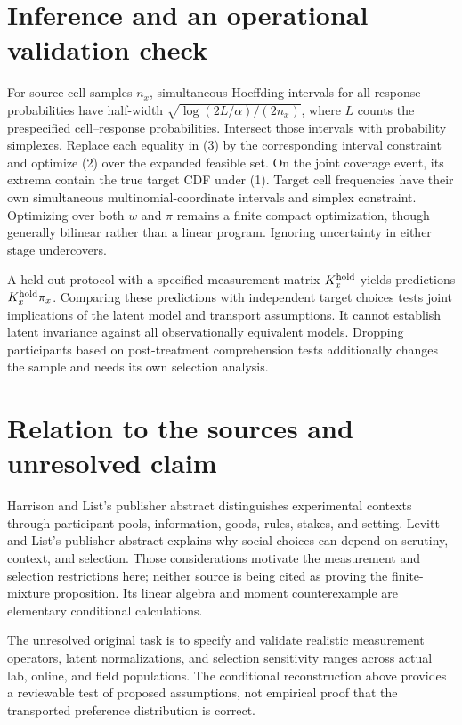\documentclass[11pt]{article}
\begin{document}
\section{Inference and an operational validation check}
For source cell samples $n_x$, simultaneous Hoeffding intervals for all
response probabilities have half-width
$\sqrt{\log(2L/\alpha)/(2n_x)}$, where $L$ counts the prespecified
cell--response probabilities. Intersect those intervals with probability
simplexes. Replace each equality in (3) by the corresponding interval
constraint and optimize (2) over the expanded feasible set. On the joint
coverage event, its extrema contain the true target CDF under (1).
Target cell frequencies have their own simultaneous multinomial-coordinate
intervals and simplex constraint. Optimizing over both $w$ and $\pi$
remains a finite compact optimization, though generally bilinear rather
than a linear program. Ignoring uncertainty in either stage undercovers.

A held-out protocol with a specified measurement matrix $K^{\rm hold}_x$
yields predictions $K^{\rm hold}_x\pi_x$. Comparing these predictions with
independent target choices tests joint implications of the latent model
and transport assumptions. It cannot establish latent invariance against
all observationally equivalent models. Dropping participants based on
post-treatment comprehension tests additionally changes the sample and
needs its own selection analysis.

\section{Relation to the sources and unresolved claim}
Harrison and List's publisher abstract distinguishes experimental contexts
through participant pools, information, goods, rules, stakes, and setting.
Levitt and List's publisher abstract explains why social choices can depend
on scrutiny, context, and selection. Those considerations motivate the
measurement and selection restrictions here; neither source is being cited
as proving the finite-mixture proposition. Its linear algebra and moment
counterexample are elementary conditional calculations.

The unresolved original task is to specify and validate realistic
measurement operators, latent normalizations, and selection sensitivity
ranges across actual lab, online, and field populations. The conditional
reconstruction above provides a reviewable test of proposed assumptions,
not empirical proof that the transported preference distribution is correct.
\end{document}
